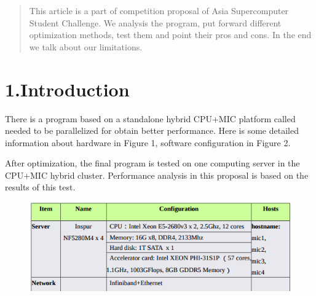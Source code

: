 \documentclass{article}
\begin{document}
\mdxtitleblockstart{}
\mdxauthorstart{}
\mdxauthorend\mdtitleauthorrunning{}{}\mdxtitleblockend%

\begin{abstract}%

\noindent{}This article is a part of competition proposal of Asia Supercomputer Student Challenge. We analysis the  program, put forward different optimization methods, test them and point their pros and cons. In the end we talk about our limitations.%
\end{abstract}%

\section{1.\hspace*{0.5em}Introduction}\label{sec-introduction}%

\noindent{}There is a program based on a standalone hybrid CPU+MIC platform called  needed to be parallelized for obtain better performance. Here is some detailed information about hardware in Figure 1, software configuration in Figure 2.%

After optimization, the final program is tested on one computing server in the CPU+MIC hybrid cluster. Performance analysis in this proposal is based on the results of this test.%

\begin{figure}[tbp]%
\begin{mdcenter}%

\noindent{}\includegraphics[keepaspectratio=true,width=\dimmin{}{\dimwidth{0.90}}]{images/2016-02-18-23-01-13-}{}%

\mdhr{}%

\noindent{}%
\end{mdcenter}\label{fig-myfigure}%
\end{figure}%
\end{document}
